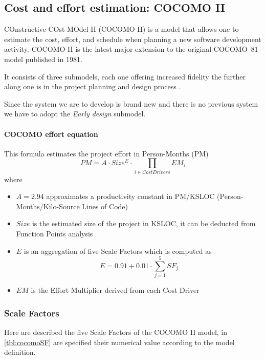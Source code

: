 \subsection{Cost and effort estimation: COCOMO II} 
COnstructive COst MOdel II (COCOMO II) is a model that allows one to estimate the cost, effort, and schedule when planning a new software development activity. COCOMO II is the latest major extension to the original \mbox{COCOMO 81} model published in 1981.

It consists of three submodels, each one offering increased fidelity the further along one is in the project planning and design process \cite{COCOMO}.

Since the system we are to develop is brand new and there is no previous system we have to adopt the \emph{Early design} submodel.

\paragraph{COCOMO effort equation}\label{par:cocomoEquation}This formula estimates the project effort in Person-Months (PM)
$$PM = A \cdot Size^{E} \cdot \prod_{i \in CostDrivers}EM_{i}$$
where 
\begin{itemize}
	\item $A=2.94$ approximates a productivity constant in PM/KSLOC (Person-Months/Kilo-Source Lines of Code)
	\item $Size$ is the estimated size of the project in KSLOC, it can be deducted from Function Points analysis
	\item $E$ is an aggregation of five Scale Factors which is computed as $$E = 0.91 + 0.01 \cdot \sum_{j=1}^{5}{SF_j}$$
	\item $EM$ is the Effort Multiplier derived from each Cost Driver
\end{itemize}

\clearpage

\subsubsection{Scale Factors}
Here are described the five Scale Factors of the COCOMO II model, in \autoref{tbl:cocomoSF} are specified their numerical value according to the model definition.
 
